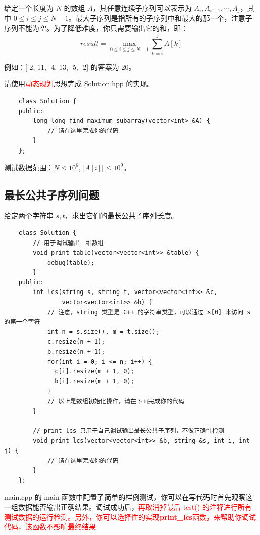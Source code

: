 \documentclass[12pt,a4paper]{article}
\begin{document}
给定一个长度为 $N$ 的数组 $A$，其任意连续子序列可以表示为 $A_i, A_{i+1}, \cdots, A_{j}$，其中 $0\le i \le j \le N-1$。最大子序列是指所有的子序列中和最大的那一个，注意子序列不能为空。为了降低难度，你只需要输出它的和，即：
$$result = \max_{0\le i\le j \le N-1}{\sum_{k=i}^j A[k]}$$

例如：[-2, 11, -4, 13, -5, -2] 的答案为 20。

请使用\textcolor{red}{动态规划}思想完成 Solution.hpp 的实现。

\begin{lstlisting}
    class Solution {
    public:
        long long find_maximum_subarray(vector<int> &A) {
            // 请在这里完成你的代码
        }
    };
\end{lstlisting}

测试数据范围：$N\le 10^6$, $|A[i]| \le 10^9$。



\subsection{最长公共子序列问题}

给定两个字符串 $s, t$，求出它们的最长公共子序列长度。

\begin{lstlisting}
    class Solution {
        // 用于调试输出二维数组
        void print_table(vector<vector<int>> &table) {
            debug(table);
        }
    public:
        int lcs(string s, string t, vector<vector<int>> &c,
                vector<vector<int>> &b) {
            // 注意，string 类型是 C++ 的字符串类型，可以通过 s[0] 来访问 s 的第一个字符
            int n = s.size(), m = t.size();
            c.resize(n + 1);
            b.resize(n + 1);
            for(int i = 0; i <= n; i++) {
              c[i].resize(m + 1, 0);
              b[i].resize(m + 1, 0);
            }
            // 以上是数组初始化操作，请在下面完成你的代码
        }
    
        // print_lcs 只用于自己调试输出最长公共子序列，不做正确性检测
        void print_lcs(vector<vector<int>> &b, string &s, int i, int j) {
            // 请在这里完成你的代码
        }
    };
\end{lstlisting}

main.cpp 的 main 函数中配置了简单的样例测试，你可以在写代码时首先观察这一组数据能否输出正确结果。调试成功后，\textcolor{red}{再取消掉最后 test() 的注释进行所有测试数据的运行检测。另外，你可以选择性的实现\textbf{print\_lcs}函数，来帮助你调试代码，该函数不影响最终结果}
\end{document}
